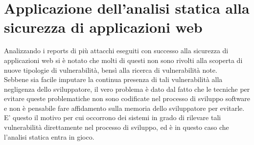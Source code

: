 \chapter{Applicazione dell'analisi statica alla sicurezza di applicazioni web}

\begin{epigraphs}
\end{epigraphs}

Analizzando i reports di più attacchi eseguiti con successo alla sicurezza di applicazioni web si è notato che molti di questi non sono rivolti alla scoperta di nuove tipologie di vulnerabilità, bensì alla ricerca di vulnerabilità note.\\ Sebbene sia facile imputare la continua presenza di tali vulnerabilità alla negligenza dello sviluppatore, il vero problema è dato dal fatto che le tecniche per evitare queste problematiche non sono codificate nel processo di sviluppo software e non è pensabile fare affidamento sulla memoria dello sviluppatore per evitarle. E' questo il motivo per cui occorrono dei sistemi in grado di rilevare tali vulnerabilità direttamente nel processo di sviluppo, ed è in questo caso che l'analisi statica entra in gioco.

